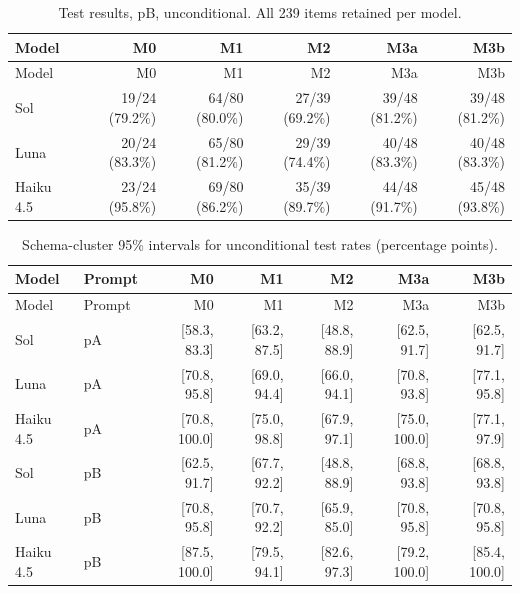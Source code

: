 \documentclass[11pt,a4paper]{article}
\begin{document}
\begingroup\small\setlength{\tabcolsep}{4pt}
\begin{longtable}{lrrrrr}
\caption{Test results, pB, unconditional. All 239 items retained per model.}\\
\toprule
Model & M0 & M1 & M2 & M3a & M3b \\
\midrule\endfirsthead
\toprule
Model & M0 & M1 & M2 & M3a & M3b \\
\midrule\endhead
\bottomrule\endfoot
Sol & 19/24 (79.2\%) & 64/80 (80.0\%) & 27/39 (69.2\%) & 39/48 (81.2\%) & 39/48 (81.2\%) \\
Luna & 20/24 (83.3\%) & 65/80 (81.2\%) & 29/39 (74.4\%) & 40/48 (83.3\%) & 40/48 (83.3\%) \\
Haiku 4.5 & 23/24 (95.8\%) & 69/80 (86.2\%) & 35/39 (89.7\%) & 44/48 (91.7\%) & 45/48 (93.8\%) \\
\end{longtable}\endgroup


\begingroup\small\setlength{\tabcolsep}{4pt}
\begin{longtable}{llrrrrr}
\caption{Schema-cluster 95\% intervals for unconditional test rates (percentage points).}\\
\toprule
Model & Prompt & M0 & M1 & M2 & M3a & M3b \\
\midrule\endfirsthead
\toprule
Model & Prompt & M0 & M1 & M2 & M3a & M3b \\
\midrule\endhead
\bottomrule\endfoot
Sol & pA & [58.3, 83.3] & [63.2, 87.5] & [48.8, 88.9] & [62.5, 91.7] & [62.5, 91.7] \\
Luna & pA & [70.8, 95.8] & [69.0, 94.4] & [66.0, 94.1] & [70.8, 93.8] & [77.1, 95.8] \\
Haiku 4.5 & pA & [70.8, 100.0] & [75.0, 98.8] & [67.9, 97.1] & [75.0, 100.0] & [77.1, 97.9] \\
Sol & pB & [62.5, 91.7] & [67.7, 92.2] & [48.8, 88.9] & [68.8, 93.8] & [68.8, 93.8] \\
Luna & pB & [70.8, 95.8] & [70.7, 92.2] & [65.9, 85.0] & [70.8, 95.8] & [70.8, 95.8] \\
Haiku 4.5 & pB & [87.5, 100.0] & [79.5, 94.1] & [82.6, 97.3] & [79.2, 100.0] & [85.4, 100.0] \\
\end{longtable}\endgroup
\end{document}
